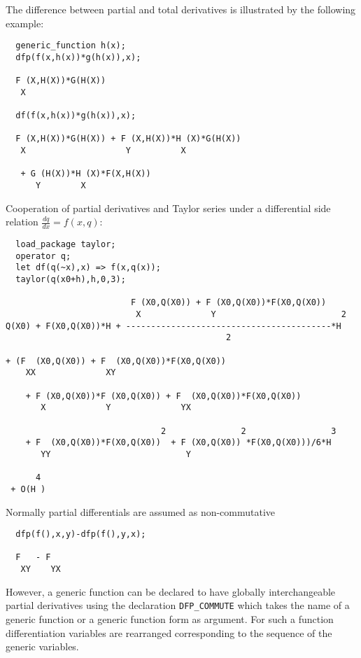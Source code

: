 The difference between partial and total derivatives is
illustrated by the following example:

\begin{verbatim}
  generic_function h(x);
  dfp(f(x,h(x))*g(h(x)),x);

  F (X,H(X))*G(H(X))
   X

  df(f(x,h(x))*g(h(x)),x);

  F (X,H(X))*G(H(X)) + F (X,H(X))*H (X)*G(H(X))
   X                    Y          X

   + G (H(X))*H (X)*F(X,H(X))
      Y        X
\end{verbatim}

Cooperation of partial derivatives and Taylor series under
a differential side relation $\frac{dq}{dx}=f(x,q)$:

\begin{verbatim}
  load_package taylor;
  operator q; 
  let df(q(~x),x) => f(x,q(x));
  taylor(q(x0+h),h,0,3);

                         F (X0,Q(X0)) + F (X0,Q(X0))*F(X0,Q(X0))
                          X              Y                         2
Q(X0) + F(X0,Q(X0))*H + -----------------------------------------*H
                                            2

+ (F  (X0,Q(X0)) + F  (X0,Q(X0))*F(X0,Q(X0))
    XX              XY

    + F (X0,Q(X0))*F (X0,Q(X0)) + F  (X0,Q(X0))*F(X0,Q(X0))
       X            Y              YX

                               2               2                 3
    + F  (X0,Q(X0))*F(X0,Q(X0))  + F (X0,Q(X0)) *F(X0,Q(X0)))/6*H
       YY                           Y

      4
 + O(H )

\end{verbatim}

Normally partial differentials are assumed as non-commutative

\begin{verbatim}
  dfp(f(),x,y)-dfp(f(),y,x);

  F   - F
   XY    YX
\end{verbatim}

However, a generic function can be declared to have globally
interchangeable partial derivatives using the declaration 
{\tt DFP\_COMMUTE}
which takes the name of a generic function or a generic function
form as argument. For such a function differentiation variables are
rearranged corresponding to the sequence of the generic variables.

